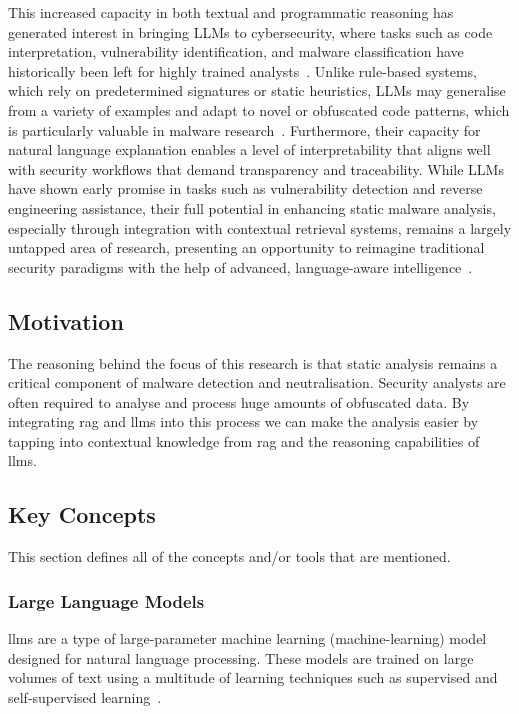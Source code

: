 This increased capacity in both textual and programmatic reasoning has generated interest in
bringing LLMs to cybersecurity, where tasks such as code interpretation, vulnerability
identification, and malware classification have historically been left for highly trained
analysts~\cite{wong2021practice}. Unlike rule-based systems, which rely on predetermined signatures
or static heuristics, LLMs may generalise from a variety of examples and adapt to novel or
obfuscated code patterns, which is particularly valuable in malware
research~\cite{metta2024generativeai}. Furthermore, their capacity for natural language explanation
enables a level of interpretability that aligns well with security workflows that demand
transparency and traceability. While LLMs have shown early promise in tasks such as vulnerability
detection and reverse engineering assistance, their full potential in enhancing static malware
analysis, especially through integration with contextual retrieval systems, remains a largely
untapped area of research, presenting an opportunity to reimagine traditional security paradigms
with the help of advanced, language-aware intelligence~\cite{lewis2020retrieval,gao2023retrieval}.

\subsection{Motivation}\label{subsec:Motivation}
The reasoning behind the focus of this research is that static analysis remains a critical
component of malware detection and neutralisation. Security analysts are often required to analyse
and process huge amounts of obfuscated data. By integrating \gls{rag} and \glspl{llm} into this
process we can make the analysis easier by tapping into contextual knowledge from \gls{rag} and the
reasoning capabilities of \glspl{llm}.

\subsection{Key Concepts}\label{subsec:KeyConcepts}
This section defines all of the concepts and/or tools that are mentioned.

\subsubsection{Large Language Models}\label{subsubsec:LLMs}
\glspl{llm} are a type of large-parameter machine learning (\gls{machine-learning}) model designed
for natural language processing. These models are trained on large volumes of text using a
multitude of learning techniques such as supervised and self-supervised learning~\cite{vaswani2023attentionneed}.

